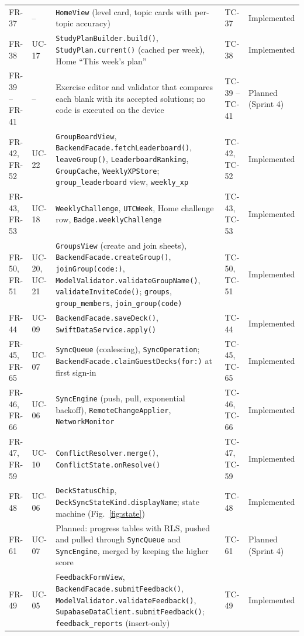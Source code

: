 \documentclass[12pt,letterpaper]{article}
\begin{document}
\begin{xltabular}{\textwidth}{@{}l L{1.6cm} Y L{2.0cm} L{1.9cm}@{}}
FR-37 & -- & \texttt{HomeView} (level card, topic cards with per-topic accuracy) & TC-37 & Implemented \\
FR-38 & UC-17 & \texttt{StudyPlanBuilder.build()}, \texttt{StudyPlan.current()} (cached per week), Home ``This week's plan'' & TC-38 & Implemented \\
FR-39 -- FR-41 & -- & Exercise editor and validator that compares each blank with its accepted solutions; no code is executed on the device & TC-39 -- TC-41 & Planned (Sprint 4) \\
FR-42, FR-52 & UC-22 & \texttt{GroupBoardView}, \texttt{BackendFacade.fetchLeaderboard()}, \texttt{leaveGroup()}, \texttt{LeaderboardRanking}, \texttt{GroupCache}, \texttt{WeeklyXPStore}; \texttt{group\_leaderboard} view, \texttt{weekly\_xp} & TC-42, TC-52 & Implemented \\
FR-43, FR-53 & UC-18 & \texttt{WeeklyChallenge}, \texttt{UTCWeek}, Home challenge row, \texttt{Badge.weeklyChallenge} & TC-43, TC-53 & Implemented \\
FR-50, FR-51 & UC-20, UC-21 & \texttt{GroupsView} (create and join sheets), \texttt{BackendFacade.createGroup()}, \texttt{joinGroup(code:)}, \texttt{ModelValidator.validateGroupName()}, \texttt{validateInviteCode()}; \texttt{groups}, \texttt{group\_members}, \texttt{join\_group(code)} & TC-50, TC-51 & Implemented \\
FR-44 & UC-09 & \texttt{BackendFacade.saveDeck()}, \texttt{SwiftDataService.apply()} & TC-44 & Implemented \\
FR-45, FR-65 & UC-07 & \texttt{SyncQueue} (coalescing), \texttt{SyncOperation}; \texttt{BackendFacade.\allowbreak claimGuestDecks(for:)} at first sign-in & TC-45, TC-65 & Implemented \\
FR-46, FR-66 & UC-06 & \texttt{SyncEngine} (push, pull, exponential backoff), \texttt{RemoteChangeApplier}, \texttt{NetworkMonitor} & TC-46, TC-66 & Implemented \\
FR-47, FR-59 & UC-10 & \texttt{ConflictResolver.merge()}, \texttt{ConflictState.onResolve()} & TC-47, TC-59 & Implemented \\
FR-48 & UC-06 & \texttt{DeckStatusChip}, \texttt{DeckSyncStateKind.displayName}; state machine (Fig.~\ref{fig:state}) & TC-48 & Implemented \\
FR-61 & UC-07 & Planned: progress tables with RLS, pushed and pulled through \texttt{SyncQueue} and \texttt{SyncEngine}, merged by keeping the higher score & TC-61 & Planned (Sprint 4) \\
FR-49 & UC-05 & \texttt{FeedbackFormView}, \texttt{BackendFacade.submitFeedback()}, \texttt{ModelValidator.validateFeedback()}, \texttt{SupabaseDataClient.submitFeedback()}; \texttt{feedback\_reports} (insert-only) & TC-49 & Implemented \\
\end{xltabular}
\end{document}
